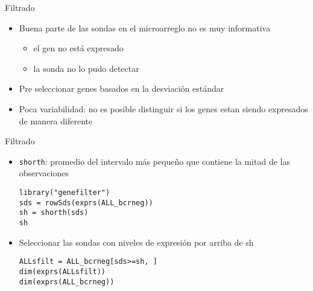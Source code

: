 \documentclass{beamer}
\begin{document}
\begin{frame}[fragile]{Filtrado}
\begin{itemize}
\item Buena parte de las sondas en el microarreglo no es muy informativa
\begin{itemize}
	\item el gen no está expresado
	\item la sonda no lo pudo detectar
\end{itemize}
\item Pre seleccionar genes basados en la desviación estándar
\item Poca variabilidad: no es posible distinguir si los genes estan siendo expresados de manera diferente
\end{itemize}
\end{frame}


\begin{frame}[fragile]{Filtrado}
\begin{itemize}
\item \verb=shorth=: promedio del intervalo más pequeño que contiene la mitad de las observaciones
\begin{verbatim}
library("genefilter")
sds = rowSds(exprs(ALL_bcrneg))
sh = shorth(sds)
sh
\end{verbatim}
\item Seleccionar las sondas con niveles de expresión por arriba de sh
\begin{verbatim}
ALLsfilt = ALL_bcrneg[sds>=sh, ]
dim(exprs(ALLsfilt))
dim(exprs(ALL_bcrneg))
\end{verbatim}
\end{itemize}
\end{frame}
\end{document}
